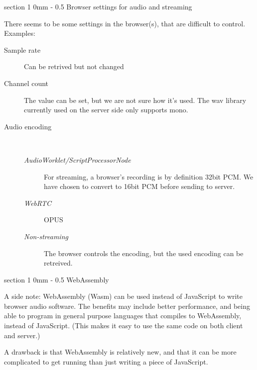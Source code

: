 \documentclass[11pt, a4paper, twoside]{article}
\makeatletter
\renewcommand{\section}{\@startsection
  {section}%
  {1}%
  {0mm}%
  {-\baselineskip}%
  {0.5\baselineskip}%
  {\bfseries\sffamily\Large}}%
\makeatother
\begin{document}
\section{Browser settings for audio and streaming}

There seems to be some settings in the browser(s), that are difficult to control. Examples:

\begin{description}
\item[Sample rate] Can be retrived but not changed
\item[Channel count] The value can be set, but we are not sure how it's used. The wav library currently used on the server side only supports mono.
\item[Audio encoding]\ \\[-14pt]
  \begin{description}
  \item[\em{AudioWorklet/ScriptProcessorNode}] For streaming, a browser's recording is by definition 32bit PCM. We have chosen to convert to 16bit PCM before sending to server.
  \item[\em{WebRTC}] OPUS
  \item[\em{ Non-streaming}] The browser controls the encoding, but the used encoding can be retreived.
    
  \end{description}

\end{description}


\section{WebAssembly}

A side note: WebAssembly (Wasm) can be used instead of JavaScript to
write browser audio software. The benefits may include better
performance, and being able to program in general purpose languages
that compiles to WebAssembly, instead of JavaScript. (This makes it
easy to use the same code on both client and server.)

A drawback is that WebAssembly is relatively new, and that it can be
more complicated to get running than just writing a piece of JavaScript.
\end{document}
